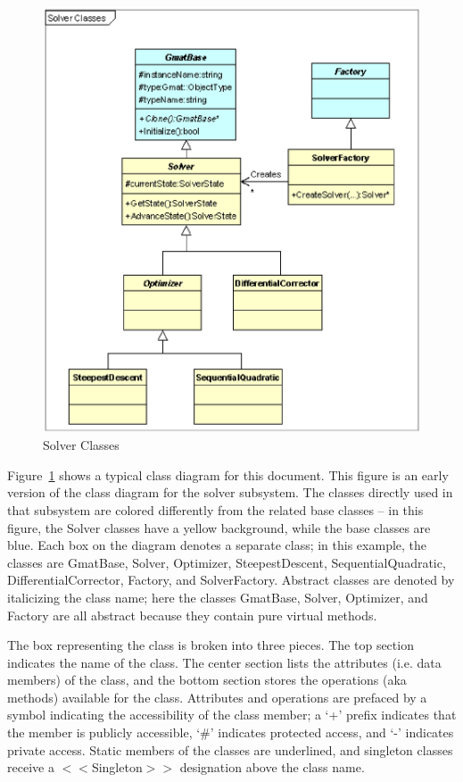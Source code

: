 \begin{figure}[htb!]
\begin{center}
\includegraphics[scale=0.5]{Images/UmlClassSample.eps}
\caption{\label{figure:UmlClassExample}Solver Classes}
\end{center}
\end{figure}

Figure~\ref{figure:UmlClassExample} shows a typical class diagram for this document.  This figure is
an early version of the class diagram for the solver subsystem.  The classes directly used in that
subsystem are colored differently from the related base classes -- in this figure, the Solver
classes have a yellow background, while the base classes are blue.  Each box on the diagram denotes
a separate class; in this example, the classes are GmatBase, Solver, Optimizer, SteepestDescent,
SequentialQuadratic, DifferentialCorrector, Factory, and SolverFactory.  Abstract classes are
denoted by italicizing the class name; here the classes GmatBase, Solver, Optimizer, and Factory are
all abstract because they contain pure virtual methods.

The box representing the class is broken into three pieces.  The top section indicates the name of
the class.  The center section lists the attributes (i.e. data members) of the class, and the bottom
section stores the operations (aka methods) available for the class.  Attributes and operations are
prefaced by a symbol indicating the accessibility of the class member; a `+' prefix indicates that
the member is publicly accessible, `\#' indicates protected access, and `-' indicates private
access.  Static members of the classes are underlined, and singleton classes receive a
$<<$Singleton$>>$ designation above the class name.

